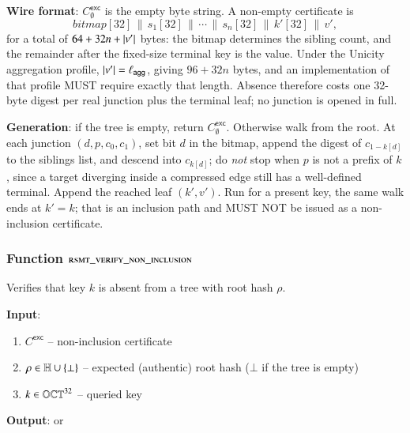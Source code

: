 \noindent\textbf{Wire format}: $C^\mathsf{exc}_\emptyset$ is the empty byte string. A non-empty certificate is
\[
	\mathit{bitmap}[32] \,\|\, s_1[32] \,\|\, \cdots \,\|\, s_n[32] \,\|\, k'[32] \,\|\, v',
\]
for a total of $64+32n+\left|v'\right|$ bytes: the bitmap determines the sibling count, and the remainder after the fixed-size terminal key is the value. Under the Unicity aggregation profile, $\left|v'\right|=\ell_{\mathsf{agg}}$, giving $96+32n$ bytes, and an implementation of that profile MUST require exactly that length. Absence therefore costs one 32-byte digest per real junction plus the terminal leaf; no junction is opened in full.

\noindent\textbf{Generation}: if the tree is empty, return $C^\mathsf{exc}_\emptyset$. Otherwise walk from the root. At each junction $(d,p,c_0,c_1)$, set bit $d$ in the bitmap, append the digest of $c_{1-k[d]}$ to the siblings list, and descend into $c_{k[d]}$; do \emph{not} stop when $p$ is not a prefix of $k$, since a target diverging inside a compressed edge still has a well-defined terminal. Append the reached leaf $(k',v')$. Run for a present key, the same walk ends at $k'=k$; that is an inclusion path and MUST NOT be issued as a non-inclusion certificate.

\subsubsection{Function $\textsc{rsmt\_verify\_non\_inclusion}$}\label{sec:rsmt-verify-non-inclusion}

Verifies that key $k$ is absent from a tree with root hash $\rho$.

\textbf{Input}:
\begin{enumerate}
	\item $C^\mathsf{exc}$ -- non-inclusion certificate
	\item $\rho \in \mathbb{H} \cup\{\bot\}$ -- expected (authentic) root hash ($\bot$ if the tree is empty)
	\item $k \in \mathbb{OCT}^{32}$ -- queried key
\end{enumerate}

\textbf{Output}: \TRUE or \FALSE

